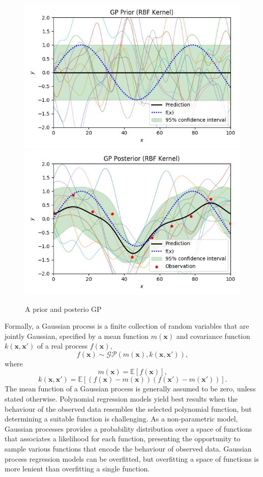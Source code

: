 \documentclass[ %
author={Dillon Keith Diep},
supervisor={Dr. Carl Henrik Ek},
degree={MEng},
title={ART-CG:},
subtitle={Assisted Real-time Content Generation of 3D Hair by Learning Manifolds},
type={Research},
year={2017} ]{dissertation}
\begin{document}
\begin{figure}[!h]
	\centering
	\includegraphics[scale=0.5]{images/gpPrior}
	\includegraphics[scale=0.5]{images/gpPosterior}
	\caption{A prior and posterio GP}
	\label{gpnoisy}
\end{figure}

Formally, a Gaussian process is a finite collection of random variables that are jointly Gaussian, specified by a mean function $m(\bm{x})$ and covariance function $k(\bm{x},\bm{x'})$ of a real process $f(\bm{x})$\cite[p.13]{gp},
$$f(\bm{x})\sim\mathcal{GP}(m(\bm{x}), k(\bm{x}, \bm{x'})),$$
where
$$m(\bm{x})=\mathbb{E}[f(\bm{x})],$$
$$k(\bm{x},\bm{x'})=\mathbb{E}[(f(\bm{x})-m(\bm{x}))(f(\bm{x'})-m(\bm{x'}))].$$
The mean function of a Gaussian process is generally assumed to be zero, unless stated otherwise.
Polynomial regression models yield best results when the behaviour of the observed data resembles the selected polynomial function, but determining a suitable function is challenging. As a non-parametric model, Gaussian processes provides a probability distribution over a space of functions that associates a likelihood for each function, presenting the opportunity to sample various functions that encode the behaviour of observed data. Gaussian process regression models can be overfitted, but overfitting a space of functions is more lenient than overfitting a single function.
\end{document}
